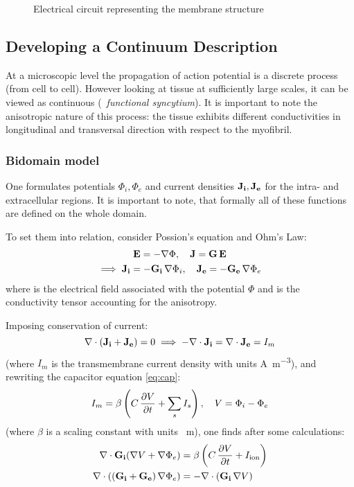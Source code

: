 \begin{figure}[h!]
    \centering
    
    \caption{Electrical circuit representing the membrane structure}
    \label{fig:circut}
\end{figure}


\subsection{Developing a Continuum Description}
\label{sec:contdescr}
At a microscopic level the propagation of action potential is a discrete
process (from cell to cell). However looking at tissue at sufficiently large
scales, it can be viewed as continuous (\textrightarrow~\emph{functional
syncytium}). It is important to note the anisotropic nature of this process:
the tissue exhibits different conductivities in longitudinal and transversal
direction with respect to the myofibril.

\subsubsection{Bidomain model}
One formulates potentials $\Phi_i, \Phi_e$ and current densities $\mathbf{J_i},
\mathbf{J_e}$ for the intra- and extracellular regions.  It is important to
note, that formally all of these functions are defined on the whole domain.

To set them into relation, consider Possion's equation and Ohm's Law:
\begin{gather*}
    \mathbf{E}=-\nabla\Phi,\quad \mathbf{J}=\mathbf{G}\,\mathbf{E} \\
    \implies \mathbf{J_i}=-\mathbf{G_i}\,\nabla\Phi_i,\quad
    \mathbf{J_e}=-\mathbf{G_e}\,\nabla\Phi_e
\end{gather*}
where  is the electrical field associated with the potential $\Phi$
and  is the conductivity tensor accounting for the anisotropy.

Imposing conservation of current:
\begin{equation*}
    \nabla\cdot(\mathbf{J_i}+\mathbf{J_e})=0 \implies
    -\nabla\cdot\mathbf{J_i}=\nabla\cdot\mathbf{J_e}=I_m
\end{equation*}
(where $I_m$ is the transmembrane current density with units
\si{\ampere\per\metre\cubed}), and rewriting the capacitor equation
\eqref{eq:cap}:
\begin{equation*}
    I_m=\beta\left(C\,\pdv{V}{t}+\sum_{s}I_{s}\right),\quad V=\Phi_i-\Phi_e
\end{equation*}
(where $\beta$ is a scaling constant with units \si{\per\metre}), one finds
after some calculations:
\begin{subequations}
\begin{align}
    \nabla\cdot\mathbf{G_i}(\nabla{V}+\nabla\Phi_e)
    &=\beta\left(C\,\pdv{V}{t}+I_{\mathrm{ion}}\right)
    \label{eq:i}
    \\
    \nabla\cdot\left((\mathbf{G_i}+\mathbf{G_e})\,\nabla\Phi_e\right)
    &=-\nabla\cdot(\mathbf{G_i}\,\nabla{V})
    \label{eq:ii}
\end{align}
\end{subequations}

